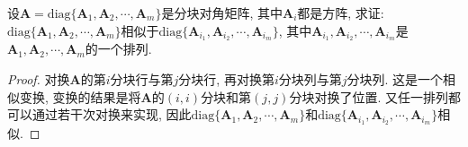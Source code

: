\documentclass[../../main.tex]{subfiles}%
\begin{document}
\begin{corollary}\label{example6.22}
设\(\boldsymbol{A}=\mathrm{diag}\{\boldsymbol{A}_{1},\boldsymbol{A}_{2},\cdots,\boldsymbol{A}_{m}\}\)是分块对角矩阵, 其中\(\boldsymbol{A}_{i}\)都是方阵, 求证: \(\mathrm{diag}\{\boldsymbol{A}_{1},\boldsymbol{A}_{2},\cdots,\boldsymbol{A}_{m}\}\)相似于\(\mathrm{diag}\{\boldsymbol{A}_{i_{1}},\boldsymbol{A}_{i_{2}},\cdots,\boldsymbol{A}_{i_{m}}\}\), 其中\(\boldsymbol{A}_{i_{1}},\boldsymbol{A}_{i_{2}},\cdots,\boldsymbol{A}_{i_{m}}\)是\(\boldsymbol{A}_{1},\boldsymbol{A}_{2},\cdots,\boldsymbol{A}_{m}\)的一个排列.
\end{corollary}
\begin{proof}
对换\(\boldsymbol{A}\)的第\(i\)分块行与第\(j\)分块行, 再对换第\(i\)分块列与第\(j\)分块列. 这是一个相似变换, 变换的结果是将\(\boldsymbol{A}\)的\((i,i)\)分块和第\((j,j)\)分块对换了位置. 又任一排列都可以通过若干次对换来实现, 因此\(\mathrm{diag}\{\boldsymbol{A}_{1},\boldsymbol{A}_{2},\cdots,\boldsymbol{A}_{m}\}\)和\(\mathrm{diag}\{\boldsymbol{A}_{i_{1}},\boldsymbol{A}_{i_{2}},\cdots,\boldsymbol{A}_{i_{m}}\}\)相似.
\end{proof}
\end{document}
